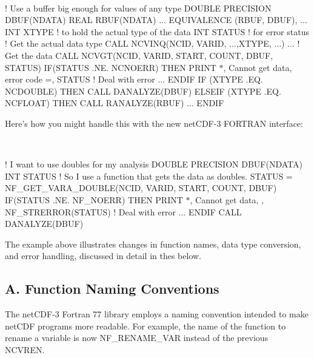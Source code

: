  

! Use a buffer big enough for values of any type D\+O\+U\+B\+LE P\+R\+E\+C\+I\+S\+I\+ON D\+B\+U\+F(\+N\+D\+A\+T\+A) R\+E\+AL R\+B\+U\+F(\+N\+D\+A\+T\+A) ... E\+Q\+U\+I\+V\+A\+L\+E\+N\+CE (R\+B\+UF, D\+B\+UF), ... I\+NT X\+T\+Y\+PE ! to hold the actual type of the data I\+NT S\+T\+A\+T\+US ! for error status ! Get the actual data type C\+A\+LL N\+C\+V\+I\+NQ(N\+C\+ID, V\+A\+R\+ID, ...,X\+T\+Y\+PE, ...) ... ! Get the data C\+A\+LL N\+C\+V\+G\+T(\+N\+C\+I\+D, V\+A\+R\+I\+D, S\+T\+A\+R\+T, C\+O\+U\+N\+T, D\+B\+U\+F, S\+T\+A\+T\+U\+S) IF(S\+T\+A\+T\+US .NE. N\+C\+N\+O\+E\+RR) T\+H\+EN P\+R\+I\+NT $\ast$, \textquotesingle{}Cannot get data, error code =\textquotesingle{}, S\+T\+A\+T\+US ! Deal with error ... E\+N\+D\+IF IF (X\+T\+Y\+PE .EQ. N\+C\+D\+O\+U\+B\+LE) T\+H\+EN C\+A\+LL D\+A\+N\+A\+L\+Y\+Z\+E(\+D\+B\+U\+F) E\+L\+S\+E\+IF (X\+T\+Y\+PE .EQ. N\+C\+F\+L\+O\+AT) T\+H\+EN C\+A\+LL R\+A\+N\+A\+L\+Y\+Z\+E(\+R\+B\+U\+F) ... E\+N\+D\+IF

Here’s how you might handle this with the new net\+C\+D\+F-\/3 F\+O\+R\+T\+R\+AN interface\+:

 

! I want to use doubles for my analysis D\+O\+U\+B\+LE P\+R\+E\+C\+I\+S\+I\+ON D\+B\+U\+F(\+N\+D\+A\+T\+A) I\+NT S\+T\+A\+T\+US ! So I use a function that gets the data as doubles. S\+T\+A\+T\+US = N\+F\+\_\+\+G\+E\+T\+\_\+\+V\+A\+R\+A\+\_\+\+D\+O\+U\+B\+L\+E(\+N\+C\+I\+D, V\+A\+R\+I\+D, S\+T\+A\+R\+T, C\+O\+U\+N\+T, D\+B\+U\+F) IF(S\+T\+A\+T\+US .NE. N\+F\+\_\+\+N\+O\+E\+RR) T\+H\+EN P\+R\+I\+NT $\ast$, \textquotesingle{}Cannot get data, \textquotesingle{}, N\+F\+\_\+\+S\+T\+R\+E\+R\+R\+O\+R(\+S\+T\+A\+T\+U\+S) ! Deal with error ... E\+N\+D\+IF C\+A\+LL D\+A\+N\+A\+L\+Y\+Z\+E(\+D\+B\+U\+F)

The example above illustrates changes in function names, data type conversion, and error handling, discussed in detail in thes below.\hypertarget{nc_f77_interface_guide_f77_function_naming_conventions}{}\subsection{A. Function Naming Conventions }\label{nc_f77_interface_guide_f77_function_naming_conventions}
The net\+C\+D\+F-\/3 Fortran 77 library employs a naming convention intended to make net\+C\+DF programs more readable. For example, the name of the function to rename a variable is now N\+F\+\_\+\+R\+E\+N\+A\+M\+E\+\_\+\+V\+AR instead of the previous N\+C\+V\+R\+EN.


